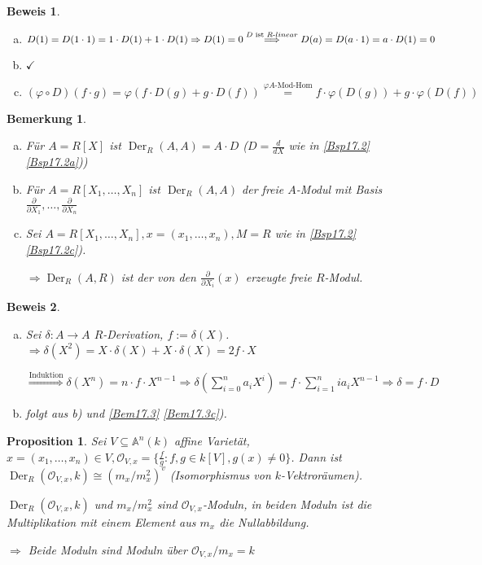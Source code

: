 \documentclass[a4paper, 12pt, numbers=noendperiod, chapterprefix=true]{scrbook}
\theoremstyle{break}
\newtheorem{Bem}[Def]{Bemerkung}
\newtheorem{Prop}[Def]{Proposition}
\theoremstyle{nonumberbreak}
\newtheorem{Bew}{Beweis}
\theoremstyle{nonumberplain}
\newcommand{\Sum}{\sum\limits}
\DeclareMathOperator{\Der}{Der}
\newcommand{\A}{\mathbb{A}}
\newcommand{\calO}{\mathcal{O}}
\begin{document}
\begin{Bew}\begin{enumerate}[a)]
\item
	$D(1)=D(1\cdot1)=1\cdot D(1) + 1\cdot D(1) \Rightarrow D(1)=0 \overset{D\text{ ist }R\text-linear}{\Longrightarrow }D(a)=D(a\cdot 1)=a\cdot D(1)=0$
\item
	$\checkmark$
\item
	$(\varphi\circ D)(f\cdot g)=\varphi(f\cdot D(g)+g\cdot D(f))\overset{\varphi A\text{-Mod-Hom}}{=} f\cdot \varphi(D(g))+ g\cdot\varphi(D(f))$
\end{enumerate}\end{Bew}

\begin{Bem}\label{bem17.4}\begin{enumerate}[a)]
\item
	F\"ur $A=R[X]$ ist $\Der_R(A,A)=A\cdot D$ ($D=\frac{d}{dX}$ wie in \ref{Bsp17.2} \ref{Bsp17.2a}))
\item
	F\"ur $A=R[X_1,\ldots ,X_n]$ ist $\Der_R(A,A)$ der freie $A$-Modul mit Basis $\frac{\partial}{\partial X_1},\ldots ,\frac{\partial}{\partial X_n}$
\item\label{bem17.4c}
	Sei $A=R[X_1,\ldots ,X_n], x=(x_1,\ldots ,x_n), M=R$ wie in \ref{Bsp17.2} \ref{Bsp17.2c}).
	
	$\Rightarrow \Der_R(A,R)$ ist der von den $\frac{\partial}{\partial X_i}(x)$ erzeugte freie $R$-Modul.
\end{enumerate}\end{Bem}

\begin{Bew}\begin{enumerate}[a)]
\item
	Sei $\delta: A\to A$ $R$-Derivation, $f:=\delta(X)$. $\Rightarrow \delta(X^2) = X\cdot\delta(X)+X\cdot\delta(X)=2f\cdot X$
	
	$\overset{\text{Induktion}}{\Longrightarrow} \delta(X^n)=n\cdot f\cdot X^{n-1} \Rightarrow \delta(\Sum_{i=0}^na_iX^i) = f\cdot \Sum_{i=1}^nia_iX^{n-1} \Rightarrow \delta=f\cdot D$
\item[c)]
	folgt aus b) und \ref{Bem17.3} \ref{Bem17.3c}).
\end{enumerate}\end{Bew}

\begin{Prop}\label{prop17.5}
Sei $V\subseteq\A^n(k)$ affine Variet\"at, $x=(x_1,\ldots ,x_n)\in V, \calO_{V,x}=\{\frac{f}{g}: f,g\in k[V], g(x)\ne 0\}$. Dann ist $\Der_R(\calO_{V,x},k)\cong(m_x/m_x^2)^v$ (Isomorphismus von $k$-Vektror\"aumen).

$\Der_R(\calO_{V,x},k)$ und $m_x/m_x^2$ sind $\calO_{V,x}$-Moduln, in beiden Moduln ist die Multiplikation mit einem Element aus $m_x$ die Nullabbildung.

$\Rightarrow $ Beide Moduln sind Moduln \"uber $\calO_{V,x}/m_x=k$
\end{Prop}
\end{document}
